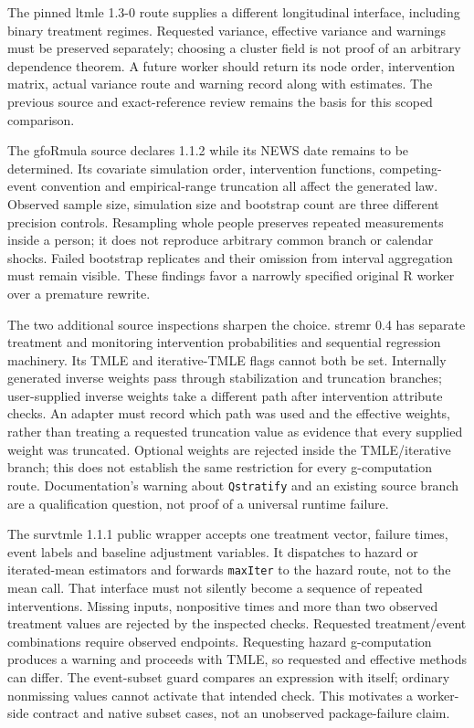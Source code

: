The pinned ltmle 1.3-0 route supplies a different longitudinal interface,
including binary treatment regimes. Requested variance, effective variance
and warnings must be preserved separately; choosing a cluster field is not
proof of an arbitrary dependence theorem. A future worker should return its
node order, intervention matrix, actual variance route and warning record
along with estimates. The previous source and exact-reference review remains
the basis for this scoped comparison. \citep{exec23_ltmle_source,exec23_ltmle_exact}

The gfoRmula source declares 1.1.2 while its NEWS date remains to be determined.
Its covariate simulation order, intervention functions, competing-event
convention and empirical-range truncation all affect the generated law.
Observed sample size, simulation size and bootstrap count are three different
precision controls. Resampling whole people preserves repeated measurements
inside a person; it does not reproduce arbitrary common branch or calendar
shocks. Failed bootstrap replicates and their omission from interval
aggregation must remain visible. These findings favor a narrowly specified
original R worker over a premature rewrite. \citep{exec20_gformula_reuse,exec20_gformula_reference}

The two additional source inspections sharpen the choice. stremr 0.4 has
separate treatment and monitoring intervention probabilities and sequential
regression machinery. Its TMLE and iterative-TMLE flags cannot both be set.
Internally generated inverse weights pass through stabilization and truncation
branches; user-supplied inverse weights take a different path after intervention
attribute checks. An adapter must record which path was used and the effective
weights, rather than treating a requested truncation value as evidence that
every supplied weight was truncated. Optional weights are rejected inside
the TMLE/iterative branch; this does not establish the same restriction for
every g-computation route. Documentation's warning about \texttt{Qstratify}
and an existing source branch are a qualification question, not proof of a
universal runtime failure. \citep{exec23_longr_stremr}

The survtmle 1.1.1 public wrapper accepts one treatment vector, failure times,
event labels and baseline adjustment variables. It dispatches to hazard or
iterated-mean estimators and forwards \texttt{maxIter} to the hazard route,
not to the mean call. That interface must not silently become a sequence of
repeated interventions. Missing inputs, nonpositive times and more than two
observed treatment values are rejected by the inspected checks. Requested
treatment/event combinations require observed endpoints. Requesting hazard
g-computation produces a warning and proceeds with TMLE, so requested and
effective methods can differ. The event-subset guard compares an expression
with itself; ordinary nonmissing values cannot activate that intended check.
This motivates a worker-side contract and native subset cases, not an
unobserved package-failure claim. \citep{exec23_longr_survtmle}

